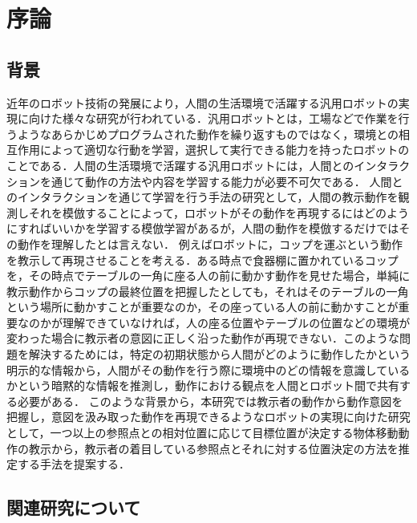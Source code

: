 ﻿%
\chapter{序論}

\section{背景}

近年のロボット技術の発展により，人間の生活環境で活躍する汎用ロボットの実現に向けた様々な研究が行われている．汎用ロボットとは，工場などで作業を行うようなあらかじめプログラムされた動作を繰り返すものではなく，環境との相互作用によって適切な行動を学習，選択して実行できる能力を持ったロボットのことである．人間の生活環境で活躍する汎用ロボットには，人間とのインタラクションを通じて動作の方法や内容を学習する能力が必要不可欠である．
人間とのインタラクションを通じて学習を行う手法の研究として，人間の教示動作を観測しそれを模倣することによって，ロボットがその動作を再現するにはどのようにすればいいかを学習する模倣学習があるが，人間の動作を模倣するだけではその動作を理解したとは言えない．
例えばロボットに，コップを運ぶという動作を教示して再現させることを考える．ある時点で食器棚に置かれているコップを，その時点でテーブルの一角に座る人の前に動かす動作を見せた場合，単純に教示動作からコップの最終位置を把握したとしても，それはそのテーブルの一角という場所に動かすことが重要なのか，その座っている人の前に動かすことが重要なのかが理解できていなければ，人の座る位置やテーブルの位置などの環境が変わった場合に教示者の意図に正しく沿った動作が再現できない．このような問題を解決するためには，特定の初期状態から人間がどのように動作したかという明示的な情報から，人間がその動作を行う際に環境中のどの情報を意識しているかという暗黙的な情報を推測し，動作における観点を人間とロボット間で共有する必要がある．
このような背景から，本研究では教示者の動作から動作意図を把握し，意図を汲み取った動作を再現できるようなロボットの実現に向けた研究として，一つ以上の参照点との相対位置に応じて目標位置が決定する物体移動動作の教示から，教示者の着目している参照点とそれに対する位置決定の方法を推定する手法を提案する．

\section{関連研究について}

